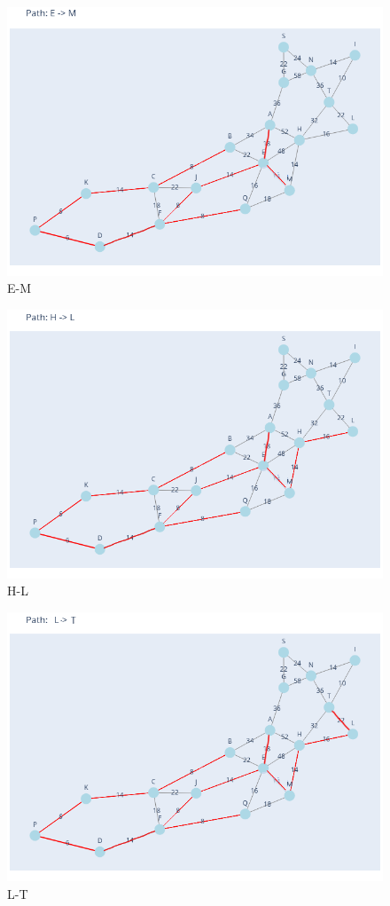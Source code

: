 \documentclass[11pt]{book}
\renewcommand{\=}[1]{\stackrel{#1}{=}} %
\theoremstyle{definition}
\theoremstyle{remark}
\begin{document}
\begin{figure}
    \centering
    \includegraphics[width=0.7\linewidth]{MSTpath/10.png}
    \caption{E-M}
    \label{fig:enter-label}
\end{figure}
\begin{figure}
    \centering
    \includegraphics[width=0.7\linewidth]{MSTpath/12.png}
    \caption{H-L}
    \label{fig:enter-label}
\end{figure}
\begin{figure}
    \centering
    \includegraphics[width=0.7\linewidth]{MSTpath/13.png}
    \caption{L-T}
    \label{fig:enter-label}
\end{figure}
\end{document}
